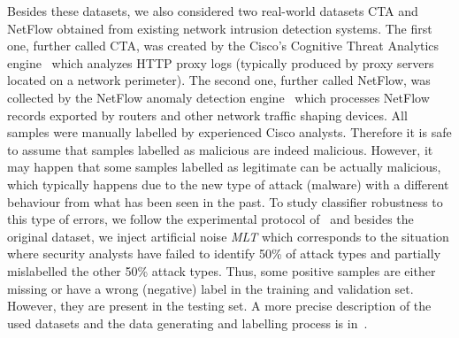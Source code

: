\documentclass[11pt,a4paper]{article}
\theoremstyle{definition}
\begin{document}
Besides these datasets, we also considered two real-world datasets CTA and NetFlow obtained from existing network intrusion detection systems. The first one, further called CTA, was created by the Cisco's Cognitive Threat Analytics engine~\cite{cisco2014cta} which analyzes HTTP proxy logs (typically produced by proxy servers located on a network perimeter). The second one, further called NetFlow, was collected by the NetFlow anomaly detection engine~\cite{rehak2009adaptive,garcia2014empirical} which processes NetFlow~\cite{cisco2004netflow} records exported by routers and other network traffic shaping devices. All samples were manually labelled by experienced Cisco analysts. Therefore it is safe to assume that samples labelled as malicious are indeed malicious. However, it may happen that some samples labelled as legitimate can be actually malicious, which typically happens due to the new type of attack (malware) with a different behaviour from what has been seen in the past. To study classifier robustness to this type of errors, we follow the experimental protocol of~\cite{grill2016learning} and besides the original dataset, we inject artificial noise \emph{MLT} which corresponds to the situation where security analysts have failed to identify 50\% of attack types and partially mislabelled the other 50\% attack types. Thus, some positive samples are either missing or have a wrong (negative) label in the training and validation set. However, they are present in the testing set. A more precise description of the used datasets and the data generating and labelling process is in~\cite{grill2016learning}.
\end{document}
